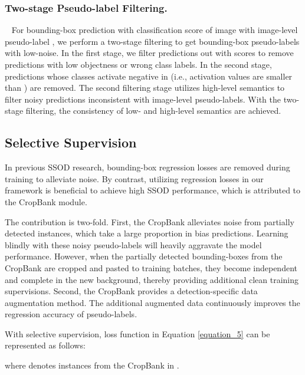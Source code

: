     
\subsubsection{Two-stage Pseudo-label Filtering. } 
\ 
\newline
For bounding-box prediction  with classification score  of image  with image-level pseudo-label , we perform a two-stage filtering to get bounding-box pseudo-labels with low-noise. In the first stage, we filter predictions out with scores  to remove predictions with low objectness or wrong class labels. In the second stage, predictions whose classes activate negative in  (i.e., activation values are smaller than ) are removed. The second filtering stage utilizes high-level semantics to filter noisy predictions inconsistent with image-level pseudo-labels. With the two-stage filtering, the consistency of low- and high-level semantics are achieved. 

\subsection{Selective Supervision}\label{3.6}
In previous SSOD research, bounding-box regression losses are removed during training to alleviate noise. By contrast, utilizing regression losses in our framework is beneficial to achieve high SSOD performance, which is attributed to the CropBank module.
    
The contribution is two-fold. First, the CropBank alleviates noise from partially detected instances, which take a large proportion in bias predictions. Learning blindly with these noisy pseudo-labels will heavily aggravate the model performance.  However, when the partially detected bounding-boxes from the CropBank are cropped and pasted to training batches, they become independent and complete in the new background, thereby providing additional clean training supervisions. Second, the CropBank provides a detection-specific data augmentation method. The additional augmented data continuously improves the regression accuracy of pseudo-labels.

With selective supervision, loss function  in Equation \ref{equation_5} can be represented as follows:

where  denotes instances from the CropBank in .

